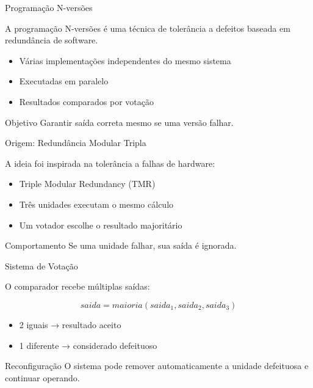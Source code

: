 \documentclass[9pt]{beamer}
\begin{document}
\begin{frame}{Programação N-versões}
\small

A programação N-versões é uma técnica de tolerância a defeitos baseada
em redundância de software.

\begin{itemize}
    \item Várias implementações independentes do mesmo sistema
    \item Executadas em paralelo
    \item Resultados comparados por votação
\end{itemize}

\begin{block}{Objetivo}
Garantir saída correta mesmo se uma versão falhar.
\end{block}

\end{frame}
\begin{frame}{Origem: Redundância Modular Tripla}
\small

A ideia foi inspirada na tolerância a falhas de hardware:

\begin{itemize}
    \item Triple Modular Redundancy (TMR)
    \item Três unidades executam o mesmo cálculo
    \item Um votador escolhe o resultado majoritário
\end{itemize}

\begin{alertblock}{Comportamento}
Se uma unidade falhar, sua saída é ignorada.
\end{alertblock}

\end{frame}
\begin{frame}{Sistema de Votação}
\small

O comparador recebe múltiplas saídas:

\[
saida = maioria(saida_1, saida_2, saida_3)
\]

\begin{itemize}
    \item 2 iguais → resultado aceito
    \item 1 diferente → considerado defeituoso
\end{itemize}

\begin{block}{Reconfiguração}
O sistema pode remover automaticamente a unidade defeituosa
e continuar operando.
\end{block}

\end{frame}
\end{document}
